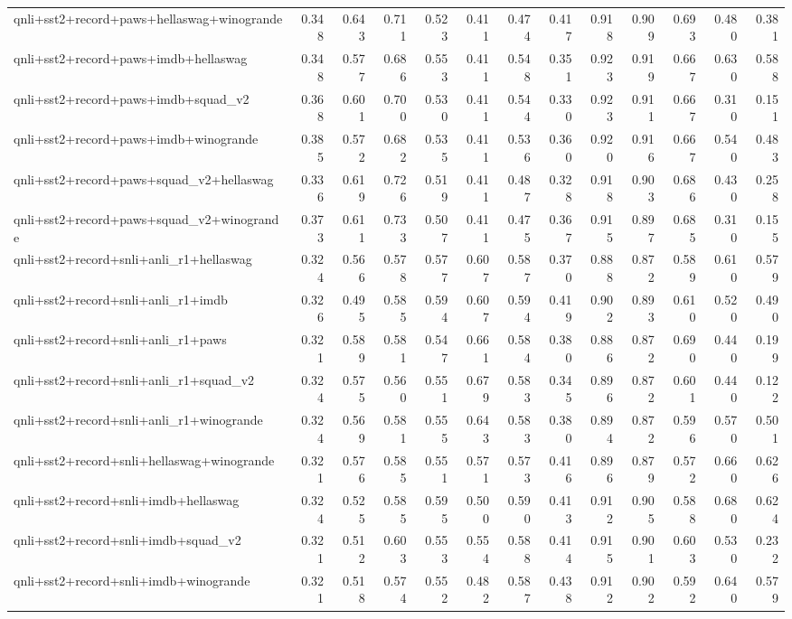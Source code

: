 \begin{table}[t]
\begin{tabular}{lrrrrrrrrrrrr}
    qnli+sst2+record+paws+hellaswag+winogrande & 0.348 & 0.643 & 0.711 & 0.523 & 0.411 & 0.474 & 0.417 & 0.918 & 0.909 & 0.693 & 0.480 & 0.381 \\
    qnli+sst2+record+paws+imdb+hellaswag & 0.348 & 0.577 & 0.686 & 0.553 & 0.411 & 0.548 & 0.351 & 0.923 & 0.919 & 0.667 & 0.630 & 0.588 \\
    qnli+sst2+record+paws+imdb+squad\_v2 & 0.368 & 0.601 & 0.700 & 0.530 & 0.411 & 0.544 & 0.330 & 0.923 & 0.911 & 0.667 & 0.310 & 0.151 \\
    qnli+sst2+record+paws+imdb+winogrande & 0.385 & 0.572 & 0.682 & 0.535 & 0.411 & 0.536 & 0.360 & 0.920 & 0.916 & 0.667 & 0.540 & 0.483 \\
    qnli+sst2+record+paws+squad\_v2+hellaswag & 0.336 & 0.619 & 0.726 & 0.519 & 0.411 & 0.487 & 0.328 & 0.918 & 0.903 & 0.686 & 0.430 & 0.258 \\
    qnli+sst2+record+paws+squad\_v2+winogrande & 0.373 & 0.611 & 0.733 & 0.507 & 0.411 & 0.475 & 0.367 & 0.915 & 0.897 & 0.685 & 0.310 & 0.155 \\
    qnli+sst2+record+snli+anli\_r1+hellaswag & 0.324 & 0.566 & 0.578 & 0.577 & 0.607 & 0.587 & 0.370 & 0.888 & 0.872 & 0.589 & 0.610 & 0.579 \\
    qnli+sst2+record+snli+anli\_r1+imdb & 0.326 & 0.495 & 0.585 & 0.594 & 0.607 & 0.594 & 0.419 & 0.902 & 0.893 & 0.610 & 0.520 & 0.490 \\
    qnli+sst2+record+snli+anli\_r1+paws & 0.321 & 0.589 & 0.581 & 0.547 & 0.661 & 0.584 & 0.380 & 0.886 & 0.872 & 0.690 & 0.440 & 0.199 \\
    qnli+sst2+record+snli+anli\_r1+squad\_v2 & 0.324 & 0.575 & 0.560 & 0.551 & 0.679 & 0.583 & 0.345 & 0.896 & 0.872 & 0.601 & 0.440 & 0.122 \\
    qnli+sst2+record+snli+anli\_r1+winogrande & 0.324 & 0.569 & 0.581 & 0.555 & 0.643 & 0.583 & 0.380 & 0.894 & 0.872 & 0.596 & 0.570 & 0.501 \\
    qnli+sst2+record+snli+hellaswag+winogrande & 0.321 & 0.576 & 0.585 & 0.551 & 0.571 & 0.573 & 0.416 & 0.896 & 0.879 & 0.572 & 0.660 & 0.626 \\
    qnli+sst2+record+snli+imdb+hellaswag & 0.324 & 0.525 & 0.585 & 0.595 & 0.500 & 0.590 & 0.413 & 0.912 & 0.905 & 0.588 & 0.680 & 0.624 \\
    qnli+sst2+record+snli+imdb+squad\_v2 & 0.321 & 0.512 & 0.603 & 0.553 & 0.554 & 0.588 & 0.414 & 0.915 & 0.901 & 0.603 & 0.530 & 0.232 \\
    qnli+sst2+record+snli+imdb+winogrande & 0.321 & 0.518 & 0.574 & 0.552 & 0.482 & 0.587 & 0.438 & 0.912 & 0.902 & 0.592 & 0.640 & 0.579 \\

\end{tabular}
\end{table}
